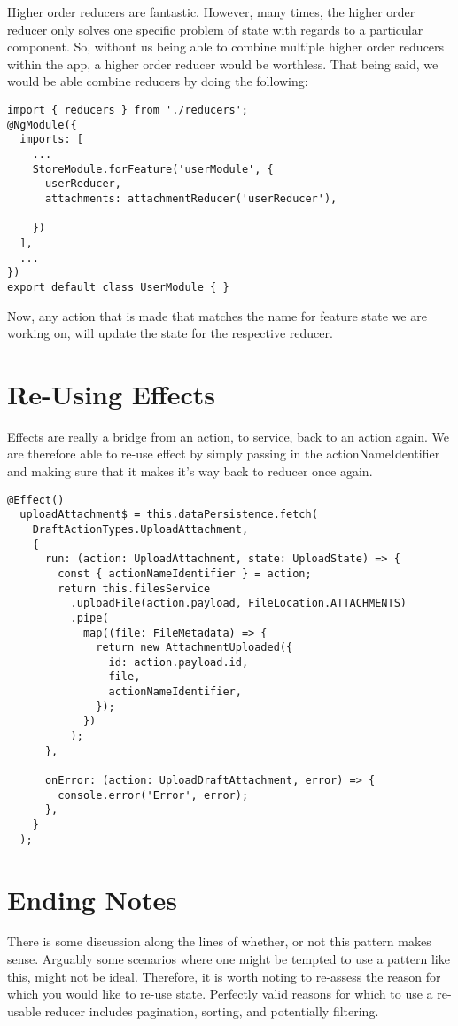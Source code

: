 Higher order reducers are fantastic. However, many times, the higher order
reducer only solves one specific problem of state with regards to a particular
component. So, without us being able to combine multiple higher order reducers
within the app, a higher order reducer would be worthless. That being said, we
would be able combine reducers by doing the following:

\begin{lstlisting}
import { reducers } from './reducers';
@NgModule({
  imports: [
    ...
    StoreModule.forFeature('userModule', {
      userReducer,
      attachments: attachmentReducer('userReducer'),

    })
  ],
  ...
})
export default class UserModule { }
\end{lstlisting}

Now, any action that is made that matches the name for feature state we are
working on, will update the state for the respective reducer.

\section{Re-Using Effects}
Effects are really a bridge from an action, to service, back to an action again.
We are therefore able to re-use effect by simply passing in the
actionNameIdentifier and making sure that it makes it's way back to reducer
once again.
\begin{lstlisting}
@Effect()
  uploadAttachment$ = this.dataPersistence.fetch(
    DraftActionTypes.UploadAttachment,
    {
      run: (action: UploadAttachment, state: UploadState) => {
        const { actionNameIdentifier } = action;
        return this.filesService
          .uploadFile(action.payload, FileLocation.ATTACHMENTS)
          .pipe(
            map((file: FileMetadata) => {
              return new AttachmentUploaded({
                id: action.payload.id,
                file,
                actionNameIdentifier,
              });
            })
          );
      },

      onError: (action: UploadDraftAttachment, error) => {
        console.error('Error', error);
      },
    }
  );
\end{lstlisting}

\section{ Ending Notes }
There is some discussion along the lines of whether, or not this pattern makes
sense. Arguably some scenarios where one might be tempted to use a pattern like
this, might not be ideal. Therefore, it is worth noting to re-assess the reason
for which you would like to re-use state. Perfectly valid reasons for which to
use a re-usable reducer includes pagination, sorting, and potentially filtering. 
